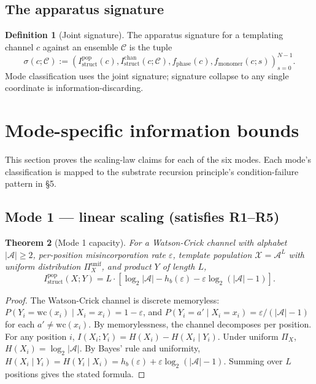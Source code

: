 \documentclass[11pt]{article}
\theoremstyle{plain}
\newtheorem{theorem}{Theorem}
\theoremstyle{definition}
\newtheorem{definition}[theorem]{Definition}
\newcommand{\Istructpop}{I_{\mathrm{struct}}^{\mathrm{pop}}}
\newcommand{\Istructchan}{I_{\mathrm{struct}}^{\mathrm{chan}}}
\newcommand{\fphase}{f_{\mathrm{phase}}}
\newcommand{\fmonomer}{f_{\mathrm{monomer}}}
\newcommand{\Hbin}{h_b}
\begin{document}
\subsection{The apparatus signature}

\begin{definition}[Joint signature]
The apparatus signature for a templating channel $c$ against an ensemble $\mathcal{C}$ is the tuple
\[
\sigma(c; \mathcal{C}) := \left(\Istructpop(c), \Istructchan(c; \mathcal{C}), \fphase(c), \fmonomer(c; s)\right)_{s = 0}^{N-1}.
\]
Mode classification uses the joint signature; signature collapse to any single coordinate is information-discarding.
\end{definition}


\section{Mode-specific information bounds}

This section proves the scaling-law claims for each of the six modes. Each mode's classification is mapped to the substrate recursion principle's condition-failure pattern in \S5.

\subsection{Mode 1 --- linear scaling (satisfies R1--R5)}

\begin{theorem}[Mode 1 capacity]
\label{thm:mode1}
For a Watson-Crick channel with alphabet $|\mathcal{A}| \ge 2$, per-position misincorporation rate $\varepsilon$, template population $\mathcal{X} = \mathcal{A}^L$ with uniform distribution $\Pi_X^{\mathrm{unif}}$, and product $Y$ of length $L$,
\[
\Istructpop(X; Y) = L \cdot \left[\log_2 |\mathcal{A}| - \Hbin(\varepsilon) - \varepsilon \log_2 (|\mathcal{A}| - 1)\right].
\]
\end{theorem}

\begin{proof}
The Watson-Crick channel is discrete memoryless: $P(Y_i = \mathrm{wc}(x_i) \mid X_i = x_i) = 1 - \varepsilon$, and $P(Y_i = a' \mid X_i = x_i) = \varepsilon / (|\mathcal{A}| - 1)$ for each $a' \neq \mathrm{wc}(x_i)$. By memorylessness, the channel decomposes per position. For any position $i$, $I(X_i; Y_i) = H(X_i) - H(X_i \mid Y_i)$. Under uniform $\Pi_X$, $H(X_i) = \log_2 |\mathcal{A}|$. By Bayes' rule and uniformity, $H(X_i \mid Y_i) = H(Y_i \mid X_i) = \Hbin(\varepsilon) + \varepsilon \log_2 (|\mathcal{A}| - 1)$. Summing over $L$ positions gives the stated formula.
\end{proof}
\end{document}
